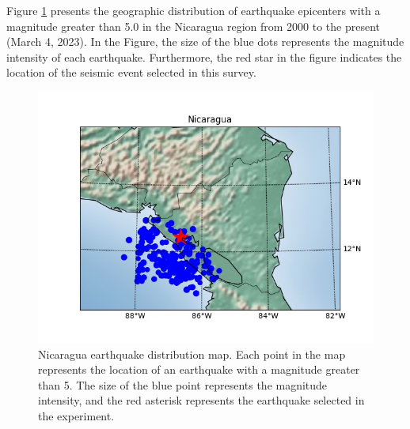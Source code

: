 \documentclass[3p,authoryear,preprint,12pt]{elsarticle}
\begin{document}
Figure \ref{fig:nicaragua} presents {the geographic distribution of earthquake epicenters} with a magnitude greater than 5.0 in the Nicaragua region from 2000 to the present (March 4, 2023). In the {Figure}, the size of the blue dots represents the magnitude intensity of each earthquake. Furthermore, the red {star} in the figure indicates the location of {the seismic event selected in this survey}.
\begin{figure}[htbp]
	\centering
	\includegraphics[width=0.8\linewidth]{Nicaragua_1990-01-01-2024-01-01}
	\caption{{Nicaragua earthquake distribution map. Each point in the map represents the location of an earthquake with a magnitude greater than 5. The size of the blue point represents the magnitude intensity, and the red asterisk represents the earthquake selected in the experiment.}}
	\label{fig:nicaragua}
\end{figure}
\end{document}
